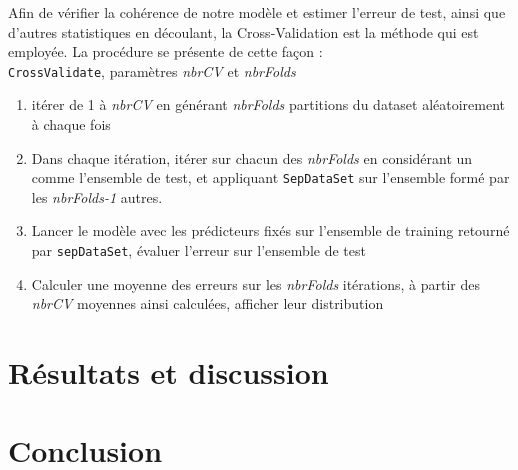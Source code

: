 \documentclass[]{article}
\begin{document}
Afin de vérifier la cohérence de notre modèle et estimer l'erreur de test, ainsi que d'autres statistiques en découlant, la Cross-Validation est la méthode qui est employée. La procédure se présente de cette façon :
~\\
\indent \texttt{CrossValidate}, paramètres \textit{nbrCV} et \textit{nbrFolds}
\begin{enumerate}
\item itérer de 1 à \textit{nbrCV} en générant \textit{nbrFolds} partitions du dataset aléatoirement à chaque fois
\item Dans chaque itération, itérer sur chacun des \textit{nbrFolds} en considérant un comme l'ensemble de test, et appliquant \texttt{SepDataSet} sur l'ensemble formé par les \textit{nbrFolds-1} autres.
\item Lancer le modèle avec les prédicteurs fixés sur l'ensemble de training retourné par \texttt{sepDataSet}, évaluer l'erreur sur l'ensemble de test
\item Calculer une moyenne des erreurs sur les \textit{nbrFolds} itérations, à partir des \textit{nbrCV} moyennes ainsi calculées, afficher leur distribution   
\end{enumerate}




\newpage

\section{Résultats et discussion}

\newpage

\section{Conclusion}
\end{document}
